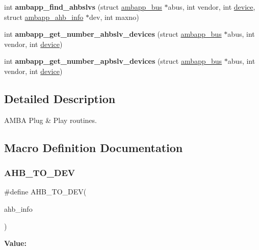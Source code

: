 \begin{DoxyCompactItemize}
\mbox{\label{group__amba_ga79eee1698fbfa62180631277f47d5611}} 
int {\bfseries ambapp\+\_\+find\+\_\+ahbslvs} (struct \mbox{\hyperlink{structambapp__bus}{ambapp\+\_\+bus}} $\ast$abus, int vendor, int \mbox{\hyperlink{structdevice}{device}}, struct \mbox{\hyperlink{structambapp__ahb__info}{ambapp\+\_\+ahb\+\_\+info}} $\ast$dev, int maxno)
\item 
\mbox{\label{group__amba_gab99e288ae9e7cf21e6d1b2cbdb6a399f}} 
int {\bfseries ambapp\+\_\+get\+\_\+number\+\_\+ahbslv\+\_\+devices} (struct \mbox{\hyperlink{structambapp__bus}{ambapp\+\_\+bus}} $\ast$abus, int vendor, int \mbox{\hyperlink{structdevice}{device}})
\item 
\mbox{\label{group__amba_ga054ec3f97dac87e44a53ab7dd00f5550}} 
int {\bfseries ambapp\+\_\+get\+\_\+number\+\_\+apbslv\+\_\+devices} (struct \mbox{\hyperlink{structambapp__bus}{ambapp\+\_\+bus}} $\ast$abus, int vendor, int \mbox{\hyperlink{structdevice}{device}})
\end{DoxyCompactItemize}


\subsection{Detailed Description}
A\+M\+BA Plug \& Play routines. 



\subsection{Macro Definition Documentation}
\mbox{\label{group__amba_ga2bbdf501782e2769ddef0c32e315e184}} 
\subsubsection{\texorpdfstring{AHB\_TO\_DEV}{AHB\_TO\_DEV}}
{\footnotesize\ttfamily \#define A\+H\+B\+\_\+\+T\+O\+\_\+\+D\+EV(\begin{DoxyParamCaption}\item[{}]{ahb\+\_\+info }\end{DoxyParamCaption})}

{\bfseries Value\+:}
\begin{DoxyCode}{0}

\end{DoxyCode}
\mbox{\label{group__amba_gac56facad3b7feebbd7583d383e732839}} 
